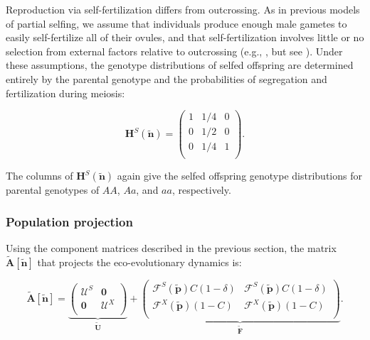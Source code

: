 \documentclass[11pt]{article}
\def\mbf#1{\mathbf{#1}}
\def\mcal#1{\mathcal{#1}}
\begin{document}
Reproduction via self-fertilization differs from outcrossing. As in previous models of partial selfing, we assume that individuals produce enough male gametes to easily self-fertilize all of their ovules, and that self-fertilization involves little or no selection from external factors relative to outcrossing (e.g., \citealt{Charlesworth1978a,JordanConnallon2014,Olito2017}, but see \citealt{Tazzyman2015}). Under these assumptions, the genotype distributions of selfed offspring are determined entirely by the parental genotype and the probabilities of segregation and fertilization during meiosis: 
\begin{linenomath*}
\begin{equation} \label{eq:HS}
	\mbf{H}^S(\tilde{\mbf{n}}) = 
			\left(
			\begin{array}{ccc}
				1 & 1/4 & 0 \\
				0 & 1/2 & 0 \\
				0 & 1/4 & 1 \\
			\end{array} \right).
\end{equation}
\end{linenomath*}

\noindent The columns of $\mbf{H}^S(\tilde{\mbf{n}})$ again give the selfed offspring genotype distributions for parental genotypes of $AA$, $Aa$, and $aa$, respectively.


\subsubsection*{Population projection}

Using the component matrices described in the previous section, the matrix $\tilde{\mbf{A}}[\tilde{\mbf{n}}]$ that projects the eco-evolutionary dynamics is:
\begin{linenomath*}
\begin{equation} \label{eq:Atilde}
	\tilde{\mbf{A}}[\tilde{\mbf{n}}] = 
			\underbrace{\left(
			\begin{array}{c|c}
				\mcal{U}^S & \mbf{0} \\ \hline
				\mbf{0} & \mcal{U}^X \\
			\end{array} \right)}_{\tilde{\mbf{U}}} + 
			\underbrace{\left(
			\begin{array}{c|c}
				\mcal{F}^S(\tilde{\mbf{p}}) C(1 - \delta) & \mcal{F}^S(\tilde{\mbf{p}}) C(1 - \delta) \\ \hline
				\mcal{F}^X(\tilde{\mbf{p}}) (1 - C) & \mcal{F}^X(\tilde{\mbf{p}}) (1 - C)\\
			\end{array} \right)}_{\tilde{\mbf{F}}}.
\end{equation}
\end{linenomath*}
\end{document}
